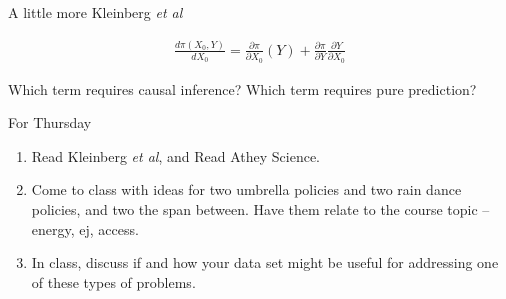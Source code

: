 \documentclass[mathserif]{beamer}
\begin{document}
\begin{frame}{A little more Kleinberg \textit{et al}}

\begin{align*}
\frac{d\pi(X_0,Y)}{d X_0} = \frac{\partial \pi}{\partial X_0}(Y) + \frac{\partial \pi}{\partial Y}\frac{\partial Y}{\partial X_0}  
\end{align*}

\vspace{5mm}

Which term requires causal inference?  Which term requires pure prediction?  
\end{frame}

\begin{frame}{For Thursday}

\begin{enumerate}
\item Read Kleinberg \textit{et al}, and Read Athey Science.  
\item Come to class with ideas for two umbrella policies and two rain dance policies, and two the span between.  Have them relate to the course topic -- energy, ej, access.  
\item In class, discuss if and how your data set might be useful for addressing one of these types of problems.  
\end{enumerate}
\end{frame}
\end{document}
